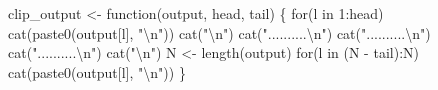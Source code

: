 \documentclass[
  letterpaper,
  DIV=11,
  numbers=noendperiod]{scrartcl}
\newenvironment{Shaded}{\begin{snugshade}}{\end{snugshade}}
\newcommand{\ControlFlowTok}[1]{\textcolor[rgb]{0.00,0.23,0.31}{#1}}
\newcommand{\DecValTok}[1]{\textcolor[rgb]{0.68,0.00,0.00}{#1}}
\newcommand{\FunctionTok}[1]{\textcolor[rgb]{0.28,0.35,0.67}{#1}}
\newcommand{\NormalTok}[1]{\textcolor[rgb]{0.00,0.23,0.31}{#1}}
\newcommand{\OtherTok}[1]{\textcolor[rgb]{0.00,0.23,0.31}{#1}}
\newcommand{\SpecialCharTok}[1]{\textcolor[rgb]{0.37,0.37,0.37}{#1}}
\newcommand{\StringTok}[1]{\textcolor[rgb]{0.13,0.47,0.30}{#1}}
\begin{document}
\begin{Shaded}
\begin{Highlighting}[]
\NormalTok{clip\_output }\OtherTok{\textless{}{-}} \ControlFlowTok{function}\NormalTok{(output, head, tail) \{}
  \ControlFlowTok{for}\NormalTok{(l }\ControlFlowTok{in} \DecValTok{1}\SpecialCharTok{:}\NormalTok{head)}
    \FunctionTok{cat}\NormalTok{(}\FunctionTok{paste0}\NormalTok{(output[l], }\StringTok{"}\SpecialCharTok{\textbackslash{}n}\StringTok{"}\NormalTok{))}
  \FunctionTok{cat}\NormalTok{(}\StringTok{"}\SpecialCharTok{\textbackslash{}n}\StringTok{"}\NormalTok{)}
  \FunctionTok{cat}\NormalTok{(}\StringTok{"..........}\SpecialCharTok{\textbackslash{}n}\StringTok{"}\NormalTok{)}
  \FunctionTok{cat}\NormalTok{(}\StringTok{"..........}\SpecialCharTok{\textbackslash{}n}\StringTok{"}\NormalTok{)}
  \FunctionTok{cat}\NormalTok{(}\StringTok{"..........}\SpecialCharTok{\textbackslash{}n}\StringTok{"}\NormalTok{)}
  \FunctionTok{cat}\NormalTok{(}\StringTok{"}\SpecialCharTok{\textbackslash{}n}\StringTok{"}\NormalTok{)}
\NormalTok{  N }\OtherTok{\textless{}{-}} \FunctionTok{length}\NormalTok{(output)}
  \ControlFlowTok{for}\NormalTok{(l }\ControlFlowTok{in}\NormalTok{ (N }\SpecialCharTok{{-}}\NormalTok{ tail)}\SpecialCharTok{:}\NormalTok{N)}
    \FunctionTok{cat}\NormalTok{(}\FunctionTok{paste0}\NormalTok{(output[l], }\StringTok{"}\SpecialCharTok{\textbackslash{}n}\StringTok{"}\NormalTok{))}
\NormalTok{\}}
\end{Highlighting}
\end{Shaded}

\begin{Shaded}
\end{Shaded}
\end{document}

